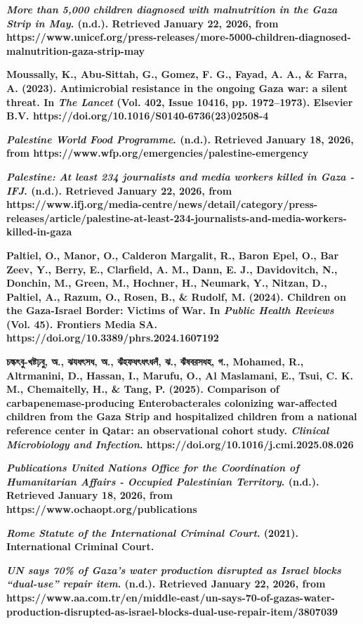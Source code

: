 \textbf{\emph{More than 5,000 children diagnosed with malnutrition in
the Gaza Strip in May}. (n.d.). Retrieved January 22, 2026, from
https://www.unicef.org/press-releases/more-5000-children-diagnosed-malnutrition-gaza-strip-may}

\textbf{Moussally, K., Abu-Sittah, G., Gomez, F. G., Fayad, A. A., \&
Farra, A. (2023). Antimicrobial resistance in the ongoing Gaza war: a
silent threat. In \emph{The Lancet} (Vol. 402, Issue 10416, pp.
1972--1973). Elsevier B.V.
https://doi.org/10.1016/S0140-6736(23)02508-4}

\textbf{\emph{Palestine \textbar{} World Food Programme}. (n.d.).
Retrieved January 18, 2026, from
https://www.wfp.org/emergencies/palestine-emergency}

\textbf{\emph{Palestine: At least 234 journalists and media workers
killed in Gaza - IFJ}. (n.d.). Retrieved January 22, 2026, from
https://www.ifj.org/media-centre/news/detail/category/press-releases/article/palestine-at-least-234-journalists-and-media-workers-killed-in-gaza}

\textbf{Paltiel, O., Manor, O., Calderon Margalit, R., Baron Epel, O.,
Bar Zeev, Y., Berry, E., Clarfield, A. M., Dann, E. J., Davidovitch, N.,
Donchin, M., Green, M., Hochner, H., Neumark, Y., Nitzan, D., Paltiel,
A., Razum, O., Rosen, B., \& Rudolf, M. (2024). Children on the
Gaza-Israel Border: Victims of War. In \emph{Public Health Reviews}
(Vol. 45). Frontiers Media SA.
https://doi.org/10.3389/phrs.2024.1607192}

\textbf{চল্কৎবু-খষ্টঢ়বু, অ., ঝযধৎসধ, অ., ঝঁহফধৎধৎধলঁ, ঝ., ঝঁষবরসধহ, গ.,
Mohamed, R., Altrmanini, D., Hassan, I., Marufu, O., Al Maslamani, E.,
Tsui, C. K. M., Chemaitelly, H., \& Tang, P. (2025). Comparison of
carbapenemase-producing Enterobacterales colonizing war-affected
children from the Gaza Strip and hospitalized children from a national
reference center in Qatar: an observational cohort study. \emph{Clinical
Microbiology and Infection}. https://doi.org/10.1016/j.cmi.2025.08.026}

\textbf{\emph{Publications \textbar{} United Nations Office for the
Coordination of Humanitarian Affairs - Occupied Palestinian Territory}.
(n.d.). Retrieved January 18, 2026, from
https://www.ochaopt.org/publications}

\textbf{\emph{Rome Statute of the International Criminal Court}. (2021).
International Criminal Court.}

\textbf{\emph{UN says 70\% of Gaza's water production disrupted as
Israel blocks ``dual-use'' repair item}. (n.d.). Retrieved January 22,
2026, from
https://www.aa.com.tr/en/middle-east/un-says-70-of-gazas-water-production-disrupted-as-israel-blocks-dual-use-repair-item/3807039}

